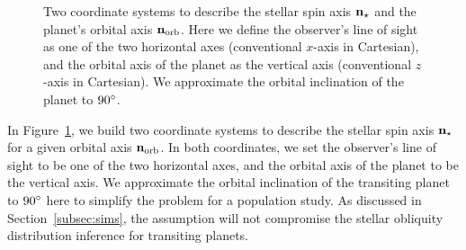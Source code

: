 \documentclass[twocolumn,times]{aastex631}
\begin{document}
\begin{figure*}[ht!]
    \vspace*{-1.5cm}
    \caption{Two coordinate systems to describe the stellar spin axis $\bf{n}_{\star}$ and the planet's orbital axis $\bf{n}_{\rm orb}$. Here we define the observer's line of sight as one of the two horizontal axes (conventional $x$-axis in Cartesian), and the orbital axis of the planet as the vertical axis (conventional $z$-axis in Cartesian). We approximate the orbital inclination of the planet to $90\mbox{$^\circ$}$.}
    \label{fig:coord}
\end{figure*}

In Figure~\ref{fig:coord}, we build two coordinate systems to describe the stellar spin axis $\bf{n}_{\star}$ for a given orbital axis $\bf{n}_{\rm orb}$. In both coordinates, we set the observer's line of sight to be one of the two horizontal axes, and the orbital axis of the planet to be the vertical axis. We approximate the orbital inclination of the transiting planet to $90\mbox{$^\circ$}$ here to simplify the problem for a population study. As discussed in Section~\ref{subsec:sims}, the assumption will not compromise the stellar obliquity distribution inference for transiting planets.
\end{document}
